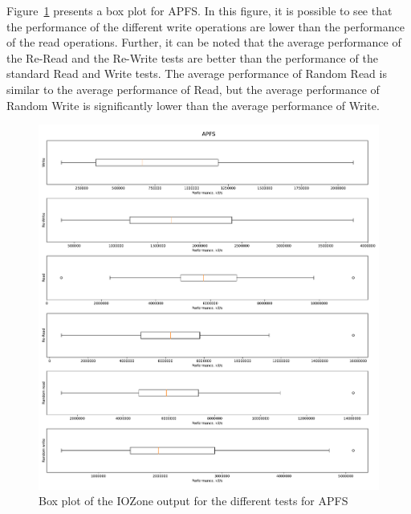 Figure~\ref{fig:res_box_apfs} presents a box plot for APFS. In this figure, it is possible to see that the performance of the different write operations are lower than the performance of the read operations. Further, it can be noted that the average performance of the Re-Read and the Re-Write tests are better than the performance of the standard Read and Write tests. The average performance of Random Read is similar to the average performance of Read, but the average performance of Random Write is significantly lower than the average performance of Write.

\begin{figure}[!htb]
	\label{fig:res_box_apfs}
	\begin{center}
		\includegraphics[width=1.0\textwidth]{figures/benchmarking/local/APFS-box.pdf}
	\end{center}
	\caption{Box plot of the IOZone output for the different tests for APFS}
\end{figure}